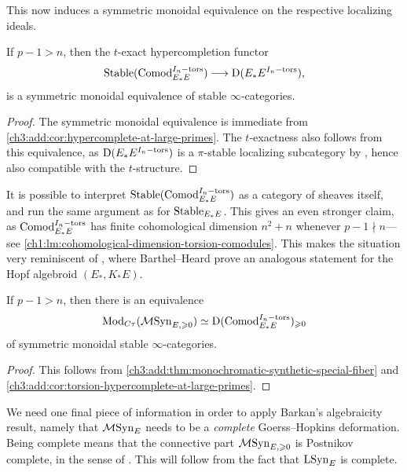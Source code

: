 This now induces a symmetric monoidal equivalence on the respective localizing ideals. 

\begin{corollary}
    \label{ch3:add:cor:torsion-hypercomplete-at-large-primes}
    If $p-1> n$, then the $t$-exact hypercompletion functor
    \[\mathrm{Stable}(\mathrm{Comod}_{E_*E}^{I_n-\mathrm{tors}}) \longrightarrow \mathrm{D}(E_*E^{I_n-\mathrm{tors}}),\]
    is a symmetric monoidal equivalence of stable $\infty$-categories.  
\end{corollary}
\begin{proof}
    The symmetric monoidal equivalence is immediate from \cref{ch3:add:cor:hypercomplete-at-large-primes}. The $t$-exactness also follows from this equivalence, as $\mathrm{D}(E_*E^{I_n-\mathrm{tors}})$ is a $\pi$-stable localizing subcategory by \cite[3.7(2)]{barthel-heard-valenzuela_2020}, hence also compatible with the $t$-structure. 
\end{proof}

\begin{remark}
    It is possible to interpret $\mathrm{Stable}(\mathrm{Comod}_{E_*E}^{I_n-\mathrm{tors}})$ as a category of sheaves itself, and run the same argument as for $\mathrm{Stable}_{E_*E}$. This gives an even stronger claim, as $\mathrm{Comod}_{E_*E}^{I_n-\mathrm{tors}}$ has finite cohomological dimension $n^2+n$ whenever $p-1\nmid n$---see \cref{ch1:lm:cohomological-dimension-torsion-comodules}. This makes the situation very reminiscent of \cite[4.7]{barthel-heard_2018}, where Barthel--Heard prove an analogous statement for the Hopf algebroid $(E_*, K_*E)$. 
\end{remark}

\begin{theorem}
    \label{ch3:add:thm:monoidal-equivalence-of-ctau-modules}
    If $p-1>n$, then there is an equivalence 
    \[\mathrm{Mod}_{C\tau}(\mathcal{M}\mathrm{Syn}_{E, \geqslant 0}) \simeq \mathrm{D}(\mathrm{Comod}_{E_*E}^{I_n-\mathrm{tors}})_{\geqslant 0}\]
    of symmetric monoidal stable $\infty$-categories. 
\end{theorem}
\begin{proof}
    This follows from \cref{ch3:add:thm:monochromatic-synthetic-special-fiber} and \cref{ch3:add:cor:torsion-hypercomplete-at-large-primes}. 
\end{proof}

We need one final piece of information in order to apply Barkan's algebraicity result, namely that $\mathcal{M}\mathrm{Syn}_{E}$ needs to be a \emph{complete} Goerss--Hopkins deformation. Being complete means that the connective part $\mathcal{M}\mathrm{Syn}_{E, \geqslant 0}$ is Postnikov complete, in the sense of \cite[A.7.2.1, C.1.2.12]{lurie_SAG}. This will follow from the fact that $\mathrm{LSyn}_{E}$ is complete. 

